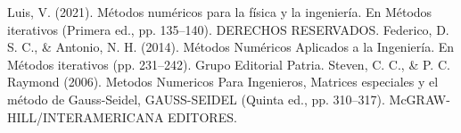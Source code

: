 \documentclass[12pt]{article}
\begin{document}
		\centering
		\begin{thebibliography}{10}
			 Luis, V. (2021). Métodos numéricos para la física y la ingeniería. En Métodos iterativos (Primera ed., pp. 135–140). DERECHOS RESERVADOS.
			 Federico, D. S. C., \& Antonio, N. H. (2014). Métodos Numéricos Aplicados a la Ingeniería. En Métodos iterativos (pp. 231–242). Grupo Editorial Patria.
			 Steven, C. C., \& P. C. Raymond (2006). Metodos Numericos Para Ingenieros, Matrices especiales y el método de Gauss-Seidel, GAUSS-SEIDEL (Quinta ed., pp. 310–317). McGRAW-HILL/INTERAMERICANA EDITORES.
		\end{thebibliography}

	
\end{document}

